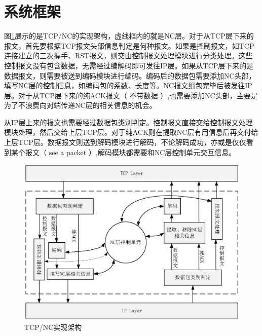 \section{系统框架}
图\ref{JIAGOU_EPS}展示的是TCP/NC的实现架构，虚线框内的就是NC层。对于从TCP层下来的报文，首先要根据TCP报文头部信息判定是何种报文。如果是控制报文，如TCP连接建立的三次握手、RST报文，则交由控制报文处理模块进行分类处理。这些控制报文没有包含数据，无需经过编解码即可发往IP层。如果从TCP层下来的是数据报文，则需要被送到编码模块进行编码。编码后的数据包需要添加NC头部，填写NC层的控制信息，如编码包的系数、长度等。NC报文组包完毕后被发往IP层。对于从TCP层下来的纯ACK报文（ 不带数据 ）,也需要添加NC头部，主要是为了不浪费向对端传递NC层的相关信息的机会。
\par
从IP层上来的报文也需要经过数据包类别判定。控制报文直接交给控制报文处理模块处理，然后交给上层TCP层。对于纯ACK则在提取NC层有用信息后再交付给上层TCP层。数据报文则送到解码模块进行解码，不论解码成功，亦或是仅仅看到某个报文（ see a packet ）,解码模块都需要和NC层控制单元交互信息。
\begin{figure}[htbp]
	\centering
	\includegraphics[width=6in]{figures/jiagou.eps}
	\caption{TCP/NC实现架构}
	\label{JIAGOU_EPS}
\end{figure}

